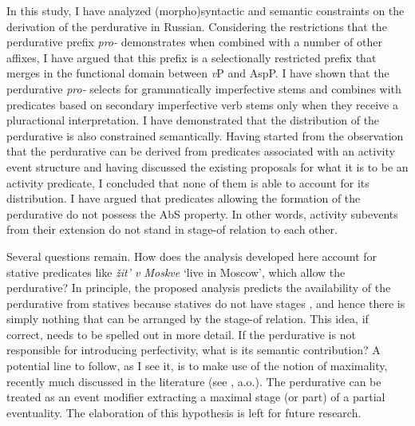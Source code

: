 \documentclass[output=paper,
]{langscibook}
\begin{document}
In this study, I have analyzed (morpho)syntactic and semantic constraints on the derivation of the perdurative in Russian. Considering the restrictions that the perdurative prefix \textit{pro-} demonstrates when combined with a number of other affixes, I have argued that this prefix is a selectionally restricted prefix that merges in the functional domain between \textit{v}P and AspP. I have shown that the perdurative \textit{pro-} selects for grammatically imperfective stems and combines with predicates based on secondary imperfective verb stems only when they receive a pluractional interpretation. I have demonstrated that the distribution of the perdurative is also constrained semantically. Having started from the observation that the perdurative can be derived from predicates associated with an activity event structure and having discussed the existing proposals for what it is to be an activity predicate, I concluded that none of them is able to account for its distribution. I have argued that predicates allowing the formation of the perdurative do not possess the AbS property. In other words, activity subevents from their extension do not stand in  stage-of relation to each other.

Several questions remain. How does the analysis developed here account for stative predicates like \textit{žit’ v Moskve} `live in Moscow', which allow the perdurative? In principle, the proposed analysis predicts the availability of the perdurative from statives because statives do not have stages \citep{landman1992progressive}, and hence there is simply nothing that can be arranged by the stage-of relation. This idea, if correct, needs to be spelled out in more detail. If the perdurative is not responsible for introducing perfectivity, what is its semantic contribution? A potential line to follow, as I see it, is to make use of the notion of maximality, recently much discussed in the literature (see \citealt{altshuler2014,filip2017semantics}, a.o.). The perdurative can be treated as an event modifier extracting a maximal stage (or part) of a partial eventuality. The elaboration of this hypothesis is left for future research.
\end{document}
